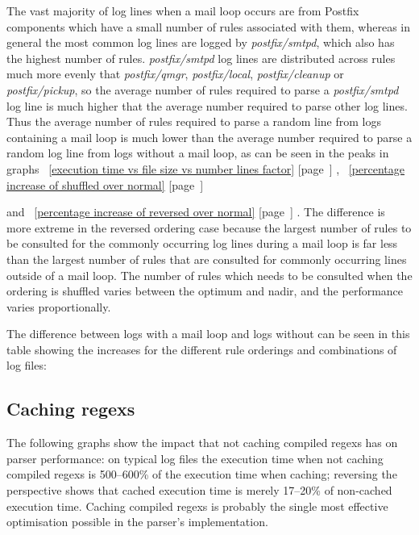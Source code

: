 \documentclass[a4paper,12pt,draft]{article}
\newcommand{\refwithpage}[1]{%
    \empty{}\ref{#1} [page~\pageref{#1}]%
}
\begin{document}
The vast majority of log lines when a mail loop occurs are from Postfix
components which have a small number of rules associated with them, whereas
in general the most common log lines are logged by \textit{postfix/smtpd},
which also has the highest number of rules.  \textit{postfix/smtpd\/} log
lines are distributed across rules much more evenly that
\textit{postfix/qmgr}, \textit{postfix/local}, \textit{postfix/cleanup\/}
or \textit{postfix/pickup}, so the average number of rules required to
parse a \textit{postfix/smtpd\/} log line is much higher that the average
number required to parse other log lines.  Thus the average number of rules
required to parse a random line from logs containing a mail loop is much
lower than the average number required to parse a random log line from logs
without a mail loop, as can be seen in the peaks in
graphs~\refwithpage{execution time vs file size vs number lines
factor},~\refwithpage{percentage increase of shuffled over normal}
and~\refwithpage{percentage increase of reversed over normal}.  The
difference is more extreme in the reversed ordering case because the
largest number of rules to be consulted for the commonly occurring log
lines during a mail loop is far less than the largest number of rules that
are consulted for commonly occurring lines outside of a mail loop.  The
number of rules which needs to be consulted when the ordering is shuffled
varies between the optimum and nadir, and the performance varies
proportionally.

The difference between logs with a mail loop and logs without can be seen
in this table showing the increases for the different rule orderings and
combinations of log files:

\noindent




\subsection{Caching regexs}

The following graphs show the impact that not caching compiled regexs has
on parser performance: on typical log files the execution time when not
caching compiled regexs is 500--600\% of the execution time when caching;
reversing the perspective shows that cached execution time is merely
17--20\% of non-cached execution time.  Caching compiled regexs is probably
the single most effective optimisation possible in the parser's
implementation.
\end{document}
